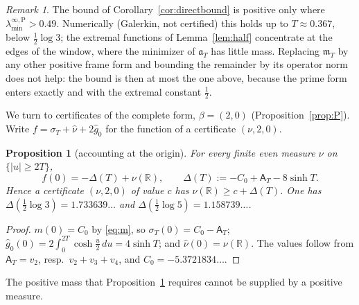 \documentclass[11pt]{amsart}
\newtheorem{proposition}[theorem]{Proposition}
\theoremstyle{definition}
\theoremstyle{remark}
\newtheorem{remark}[theorem]{Remark}
\newcommand{\R}{\mathbb R}
\newcommand{\sT}{\sigma_T}
\newcommand{\gh}[1]{\widehat g_{#1}}
\newcommand{\nuh}{\widehat\nu}
\newcommand{\Aconst}{\mathsf A_T}
\newcommand{\mT}{\mathfrak m_T}
\newcommand{\laminfP}{\lambda^{\infty,\mathrm P}_{\min}}
\begin{document}
\begin{remark}\label{rem:directbound}
The bound of Corollary~\ref{cor:directbound} is positive only where $\laminfP>0.49$. Numerically (Galerkin, not
certified) this holds up to $T\approx0.367$, below $\frac12\log3$; the extremal functions of
Lemma~\ref{lem:half} concentrate at the edges of the window, where the minimizer of $\mathfrak a_T$ has little mass.
Replacing $\mT$ by any other positive frame form and bounding the remainder by its operator norm does not help:
the bound is then at most the one above, because the prime form enters exactly and with the extremal constant
$\frac12$.
\end{remark}

We turn to certificates of the complete form, $\beta=(2,0)$ (Proposition~\ref{prop:P}). Write
$f=\sT+\nuh+2\gh0$ for the function of a certificate $(\nu,2,0)$.

\begin{proposition}[accounting at the origin]\label{prop:acct}
For every finite even measure $\nu$ on $\{|u|\ge2T\}$,
\[
f(0)=-\Delta(T)+\nu(\R),\qquad \Delta(T):=-C_0+\Aconst-8\sinh T .
\]
Hence a certificate $(\nu,2,0)$ of value $c$ has $\nu(\R)\ge c+\Delta(T)$. One has
$\Delta(\frac12\log3)=1.733639\ldots$ and $\Delta(\frac12\log5)=1.158739\ldots$.
\end{proposition}
\begin{proof}
$m(0)=C_0$ by \eqref{eq:m}, so $\sT(0)=C_0-\Aconst$; $\gh0(0)=2\int_0^{2T}\cosh\frac u2\,du=4\sinh T$; and
$\nuh(0)=\nu(\R)$. The values follow from $\Aconst=v_2$, resp.\ $v_2+v_3+v_4$, and $C_0=-5.3721834\ldots$.
\end{proof}

The positive mass that Proposition~\ref{prop:acct} requires cannot be supplied by a positive measure.
\end{document}

